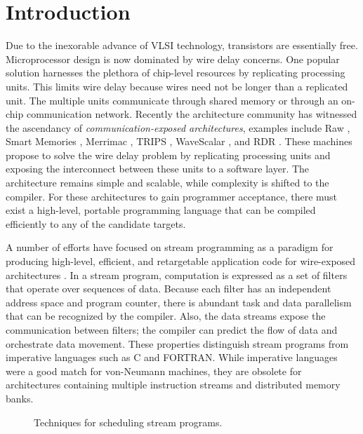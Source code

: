 \section{Introduction}

Due to the inexorable advance of VLSI technology, transistors are
essentially free.  Microprocessor design is now dominated by wire
delay concerns.  One popular solution harnesses the plethora of
chip-level resources by replicating processing units.  This limits
wire delay because wires need not be longer than a replicated unit.
The multiple units communicate through shared memory or through an
on-chip communication network.  Recently the architecture community
has witnessed the ascendancy of {\it communication-exposed architectures},
examples include Raw \cite{raw}, Smart Memories
\cite{smartmemories}, Merrimac \cite{merrimac-sc03}, TRIPS
\cite{trips}, WaveScalar \cite{wavescalar}, and RDR \cite{rdr}.  These
machines propose to solve the wire delay problem by replicating
processing units and exposing the interconnect between these units to
a software layer.  The architecture remains simple and scalable, while
complexity is shifted to the compiler. For these architectures to gain
programmer acceptance, there must exist a high-level, portable
programming language that can be compiled efficiently to any of the
candidate targets.

A number of efforts have focused on stream programming as a paradigm
for producing high-level, efficient, and retargetable application code
for wire-exposed architectures \cite{streamit-asplos,imagine-ieee,merrimac-sc03,trips-isca03}.
In a stream program, computation is expressed as a set of filters that
operate over sequences of data.  Because each filter has an
independent address space and program counter, there is abundant task
and data parallelism that can be recognized by the compiler.  Also,
the data streams expose the communication between filters; the
compiler can predict the flow of data and orchestrate data movement.
These properties distinguish stream programs from imperative languages
such as C and FORTRAN.  While imperative languages were a good match
for von-Neumann machines, they are obsolete for architectures
containing multiple instruction streams and distributed memory banks.

\begin{figure*}[th]
  \centering
  \vspace{-18pt}
  \vspace{-12pt}
  \caption{Techniques for scheduling stream programs. \protect\label{fig:spacevstime}}
  \vspace{-6pt}
\end{figure*}

